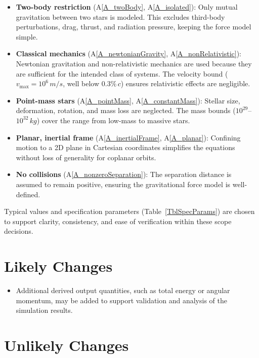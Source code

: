 \documentclass[12pt]{article}
\newcommand{\aref}[1]{A\ref{#1}}
\newcounter{lcnum} %
\begin{document}
\begin{itemize}
\item \textbf{Two-body restriction} (\aref{A_twoBody}, \aref{A_isolated}):
  Only mutual gravitation between two stars is modeled. This excludes third-body
  perturbations, drag, thrust, and radiation pressure, keeping the force model
  simple.
\item \textbf{Classical mechanics} (\aref{A_newtonianGravity},
  \aref{A_nonRelativistic}): Newtonian gravitation and non-relativistic
  mechanics are used because they are sufficient for the intended class of
  systems. The velocity bound ($v_{\max}=10^6\,\si{m\per s}$, well below
  $0.3\%\,c$) ensures relativistic effects are negligible.
\item \textbf{Point-mass stars} (\aref{A_pointMass}, \aref{A_constantMass}):
  Stellar size, deformation, rotation, and mass loss are neglected. The mass
  bounds ($10^{29}$--$10^{32}\,\si{kg}$) cover the range from low-mass to
  massive stars.
\item \textbf{Planar, inertial frame} (\aref{A_inertialFrame},
  \aref{A_planar}): Confining motion to a 2D plane in Cartesian coordinates
  simplifies the equations without loss of generality for coplanar orbits.
\item \textbf{No collisions} (\aref{A_nonzeroSeparation}): The separation
  distance is assumed to remain positive, ensuring the gravitational force model
  is well-defined.
\end{itemize}

Typical values and specification parameters (Table~\ref{TblSpecParams}) are
chosen to support clarity, consistency, and ease of verification within these
scope decisions.


\section{Likely Changes}    

\noindent \begin{itemize}

\item[LC\refstepcounter{lcnum}\thelcnum\label{LC_derivedOutputs}:] Additional
  derived output quantities, such as total energy
or angular momentum, may be added to support validation and analysis of the
simulation results.
\end{itemize}

\section{Unlikely Changes}    
\end{document}
